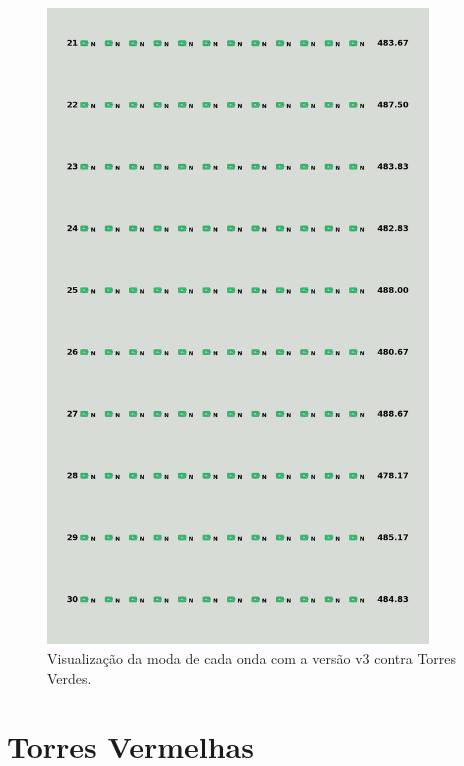 \begin{figure}[H]
  \centering
  \includegraphics[width=0.9\textwidth]{figuras/td/td_allgreen_ai_mode_3_3.png}
  \caption{Visualização da moda de cada onda com a versão v3 contra Torres Verdes.}
  \label{fig:td-moda-green-3-3}
\end{figure}

\section{Torres Vermelhas}
\label{sec:apend-moda-td-r-v3}

